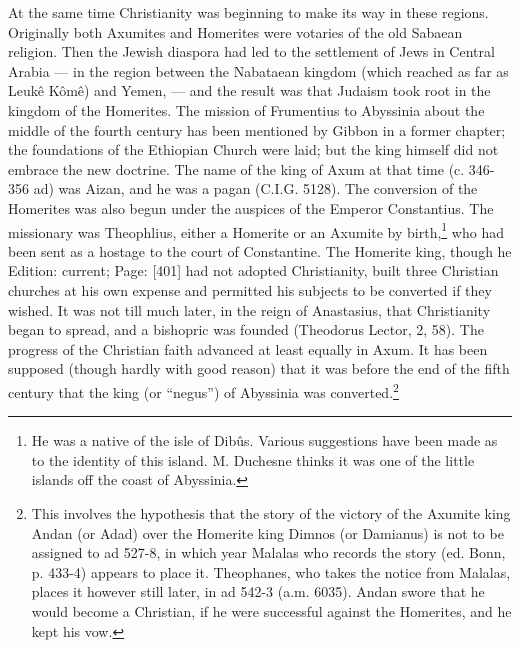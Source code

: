 At the same time Christianity was beginning to make its way in these regions. Originally both Axumites and Homerites were votaries of the old Sabaean religion. Then the Jewish diaspora had led to the settlement of Jews in Central Arabia \texthebrew{—} in the region between the Nabataean kingdom (which reached as far as Leukê Kômê) and Yemen, \texthebrew{—} and the result was that Judaism took root in the kingdom of the Homerites. The mission of Frumentius to Abyssinia about the middle of the fourth century has been mentioned by Gibbon in a former chapter; the foundations of the Ethiopian Church were laid; but the king himself did not embrace the new doctrine. The name of the king of Axum at that time (c. 346-356 ad) was Aizan, and he was a pagan (C.I.G. 5128). The conversion of the Homerites was also begun under the auspices of the Emperor Constantius. The missionary was Theophlius, either a Homerite or an Axumite by birth,\footnote{He was a native of the isle of Dibûs. Various suggestions have been made as to the identity of this island. M. Duchesne thinks it was one of the little islands off the coast of Abyssinia.} who had been sent as a hostage to the court of Constantine. The Homerite king, though he Edition: current; Page: [401] had not adopted Christianity, built three Christian churches at his own expense and permitted his subjects to be converted if they wished. It was not till much later, in the reign of Anastasius, that Christianity began to spread, and a bishopric was founded (Theodorus Lector, 2, 58). The progress of the Christian faith advanced at least equally in Axum. It has been supposed (though hardly with good reason) that it was before the end of the fifth century that the king (or \texthebrew{“}negus\texthebrew{}”) of Abyssinia was converted.\footnote{This involves the hypothesis that the story of the victory of the Axumite king Andan (or Adad) over the Homerite king Dimnos (or Damianus) is not to be assigned to ad 527-8, in which year Malalas who records the story (ed. Bonn, p. 433-4) appears to place it. Theophanes, who takes the notice from Malalas, places it however still later, in ad 542-3 (a.m. 6035). Andan swore that he would become a Christian, if he were successful against the Homerites, and he kept his vow.}

